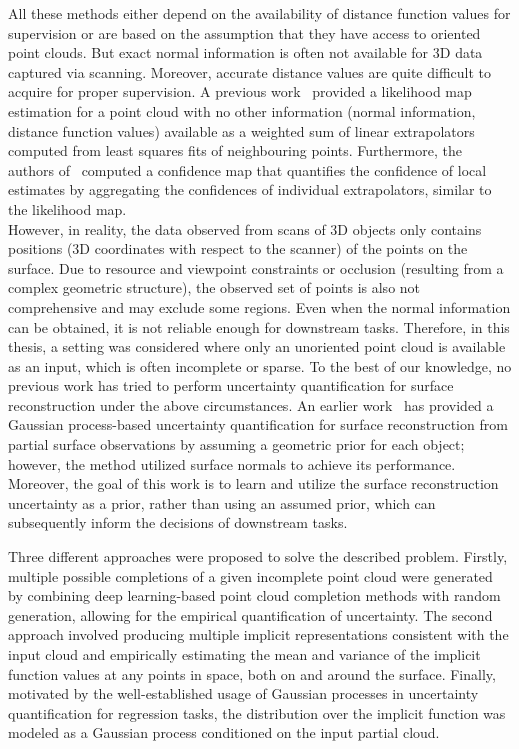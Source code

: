 All these methods either depend on the availability of distance function values for supervision or are based on the assumption that they have access to oriented point clouds. But exact normal information is often not available for 3D data captured via scanning. Moreover, accurate distance values are quite difficult to acquire for proper supervision. A previous work~\cite{UncPCS} provided a likelihood map estimation for a point cloud with no other information (normal information, distance function values) available as a weighted sum of linear extrapolators computed from least squares fits of neighbouring points. Furthermore, the authors of~\cite{UncPCS} computed a confidence map that quantifies the confidence of local estimates by aggregating the confidences of individual extrapolators, similar to the likelihood map. 
\\
However, in reality, the data observed from scans of 3D objects only contains positions (3D coordinates with respect to the scanner) of the points on the surface. Due to resource and viewpoint constraints or occlusion (resulting from a complex geometric structure), the observed set of points is also not comprehensive and may exclude some regions. Even when the normal information can be obtained, it is not reliable enough for downstream tasks. Therefore, in this thesis, a setting was considered where only an unoriented point cloud is available as an input, which is often incomplete or sparse. To the best of our knowledge, no previous work has tried to perform uncertainty quantification for surface reconstruction under the above circumstances. An earlier work~\cite{geoPriorGPIS} has provided a Gaussian process-based uncertainty quantification for surface reconstruction from partial surface observations by assuming a geometric prior for each object; however, the method utilized surface normals to achieve its performance. Moreover, the goal of this work is to learn and utilize the surface reconstruction uncertainty as a prior, rather than using an assumed prior, which can subsequently inform the decisions of downstream tasks.
\newline

Three different approaches were proposed to solve the described problem. Firstly, multiple possible completions of a given incomplete point cloud were generated by combining deep learning-based point cloud completion methods with random generation, allowing for the empirical quantification of uncertainty. The second approach involved producing multiple implicit representations consistent with the input cloud and empirically estimating the mean and variance of the implicit function values at any points in space, both on and around the surface. Finally, motivated by the well-established usage of Gaussian processes in uncertainty quantification for regression tasks, the distribution over the implicit function was modeled as a Gaussian process conditioned on the input partial cloud. 
\newline


